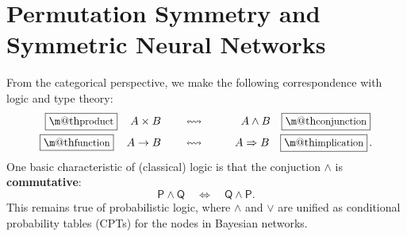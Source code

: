 \documentclass[orivec]{llncs}
\makeatletter
\renewcommand{\boxed}[1]{\fbox{\m@th$\displaystyle\scalebox{0.9}{#1}$} \,}
\makeatother
\begin{document}

\section{Permutation Symmetry and Symmetric Neural Networks}
\label{sec:commutative-structure}

From the categorical perspective, we make the following correspondence with logic and type theory:
\begin{eqnarray}
\boxed{\mbox{product}} \quad A \times B \qquad & \leftrightsquigarrow & \qquad A \wedge B \quad \boxed{\mbox{conjunction}} \nonumber \\
\boxed{\mbox{function}} \quad A \rightarrow B \qquad & \leftrightsquigarrow & \qquad A \Rightarrow B \quad \boxed{\mbox{implication}}.
\end{eqnarray}
One basic characteristic of (classical) logic is that the conjuction $\wedge$ is \textbf{commutative}:
\begin{equation}
\mathsf{P} \wedge \mathsf{Q} \quad \Leftrightarrow \quad \mathsf{Q} \wedge \mathsf{P} .
\end{equation}
This remains true of probabilistic logic, where $\wedge$ and $\vee$ are unified as conditional probability tables (CPTs) for the nodes in Bayesian networks.
\end{document}
